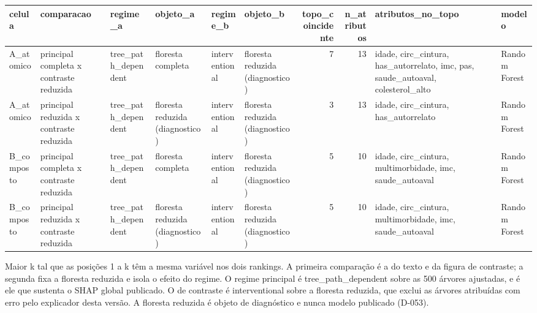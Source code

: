 \begin{tabular}{llllllrrll}
\toprule
celula & comparacao & regime_a & objeto_a & regime_b & objeto_b & topo_coincidente & n_atributos & atributos_no_topo & modelo \\
\midrule
A_atomico & principal completa x contraste reduzida & tree_path_dependent & floresta completa & interventional & floresta reduzida (diagnostico) & 7 & 13 & idade, circ_cintura, has_autorrelato, imc, pas, saude_autoaval, colesterol_alto & Random Forest \\
A_atomico & principal reduzida x contraste reduzida & tree_path_dependent & floresta reduzida (diagnostico) & interventional & floresta reduzida (diagnostico) & 3 & 13 & idade, circ_cintura, has_autorrelato & Random Forest \\
B_composto & principal completa x contraste reduzida & tree_path_dependent & floresta completa & interventional & floresta reduzida (diagnostico) & 5 & 10 & idade, circ_cintura, multimorbidade, imc, saude_autoaval & Random Forest \\
B_composto & principal reduzida x contraste reduzida & tree_path_dependent & floresta reduzida (diagnostico) & interventional & floresta reduzida (diagnostico) & 5 & 10 & idade, circ_cintura, multimorbidade, imc, saude_autoaval & Random Forest \\
\bottomrule
\end{tabular}

\begin{flushleft}
\footnotesize Maior k tal que as posições 1 a k têm a mesma variável nos dois rankings. A primeira comparação é a do texto e da figura de contraste; a segunda fixa a floresta reduzida e isola o efeito do regime. O regime principal é tree\_path\_dependent sobre as 500 árvores ajustadas, e é ele que sustenta o SHAP global publicado. O de contraste é interventional sobre a floresta reduzida, que exclui as árvores atribuídas com erro pelo explicador desta versão. A floresta reduzida é objeto de diagnóstico e nunca modelo publicado (D-053).
\end{flushleft}
